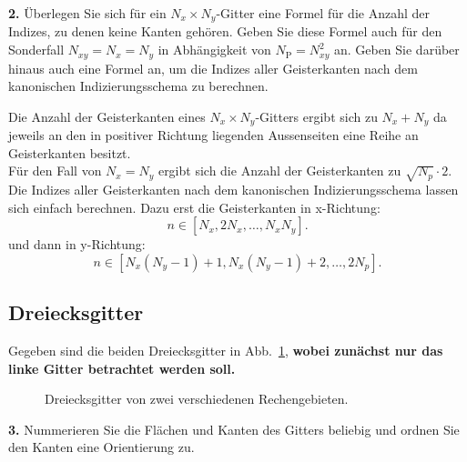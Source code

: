 \documentclass[Protokollheft.tex]{subfiles}
\begin{document}
        \begin{framed}
	\noindent \textbf{2.} \label{vorb:formel} Überlegen Sie sich für ein $N_x\times N_y$-Gitter eine Formel für die
        Anzahl der Indizes, zu denen keine Kanten gehören. Geben Sie diese Formel auch für den Sonderfall
        $N_{xy}=N_x=N_y$ in Abhängigkeit von $N_{\text{P}}=N_{xy}^2$ an. Geben Sie darüber hinaus auch eine Formel an, um die Indizes aller Geisterkanten nach dem kanonischen Indizierungsschema zu berechnen.\label{exer:nrOfGhostEdges}
\end{framed}
\noindent
Die Anzahl der Geisterkanten eines $N_x \times N_y$-Gitters ergibt sich zu $N_x + N_y$ da jeweils an den in positiver Richtung liegenden Aussenseiten eine Reihe an Geisterkanten besitzt.\\
Für den Fall von $N_x = N_y$ ergibt sich die Anzahl der Geisterkanten zu $\sqrt{N_p} \cdot 2$. Die Indizes aller Geisterkanten nach dem kanonischen Indizierungsschema lassen sich einfach berechnen. Dazu erst die Geisterkanten in x-Richtung:
\begin{equation*}
	n\in[N_x,2N_x,\dots,N_xN_y].
\end{equation*}
und dann in y-Richtung:
\begin{equation*}
n\in[N_x(N_y-1)+1,N_x(N_y-1)+2,\dots,2N_p].
\end{equation*}
%
    {\subsection{Dreiecksgitter}}
    Gegeben sind die beiden Dreiecksgitter in Abb.~\ref{fig:tetmesh}, \textbf{wobei
    zunächst nur das linke Gitter betrachtet werden soll.}
  \begin{figure}[htb]
    \centering
    \begin{subfigure}{0.49\textwidth}
        \centering
                    
    \end{subfigure}
    \begin{subfigure}{0.49\textwidth}
        \centering
        
    \end{subfigure}
    \caption{Dreiecksgitter von zwei verschiedenen Rechengebieten.}
    \label{fig:tetmesh}
  \end{figure}

        \begin{framed}
	\noindent \textbf{3.} Nummerieren Sie die Flächen und Kanten des Gitters beliebig und ordnen
                    Sie den Kanten eine Orientierung zu.\label{exer:triangleOrderedNumbering}
\end{framed}
\end{document}
